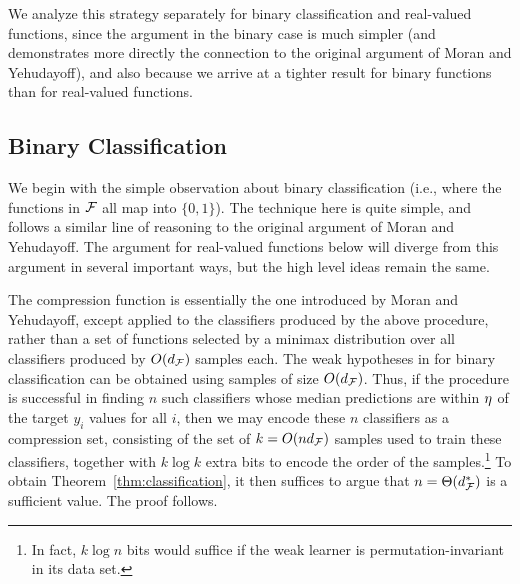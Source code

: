 \documentclass[12pt,a4paper,oneside,onecolumn]{book}
\begin{document}
We analyze this strategy separately for binary classification and real-valued functions, 
since the argument in the binary case is much simpler (and
demonstrates more directly
the connection to the 
original argument of Moran and Yehudayoff), and also because we arrive at a tighter result for binary functions 
than for real-valued functions.

    
    


\subsection{Binary Classification}

\label{subsubsec:binary-classification-compression}

We begin with the simple observation about binary classification (i.e., where the functions in $\mathcal{F}$ all map into $\{0,1\}$).
The technique here is quite simple, and follows a similar line of reasoning to the 
original argument of Moran and Yehudayoff.  The argument for real-valued functions 
below will diverge from this argument in several important ways, but the high level 
ideas remain the same.

The compression function is essentially the one introduced by Moran and Yehudayoff, 
except applied to the classifiers produced by the above  procedure, 
rather than a set of functions selected by a minimax distribution over all classifiers produced by $O(d_{\mathcal{F}})$ samples each.
The weak hypotheses in  for binary classification can be obtained using samples of size $O(d_{\mathcal{F}})$.
Thus, if the  procedure is successful in finding $n$ such classifiers whose median predictions are 
within $\eta$ of the target $y_{i}$ values for all $i$, 
then we may encode these $n$ classifiers as a compression set, 
consisting of the set of $k = O(nd_{\mathcal{F}})$ samples used to train these classifiers, 
together with $k \log k$ extra bits to encode the order of the samples.\footnote{In fact, 
$k \log n$ bits would suffice if the weak learner is permutation-invariant in its data set.}
To obtain Theorem~\ref{thm:classification}, it then suffices to argue that $n=\Theta(d^*_{\mathcal{F}})$ is a sufficient value.
The proof follows.
\end{document}
